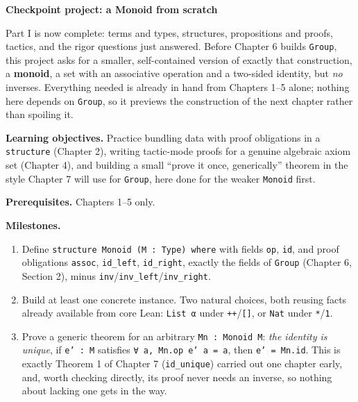 \begin{pblproject}
\label{sec:05-rigor-check:06-checkpoint-project:1}
\textbf{\large Checkpoint project: a Monoid from scratch}\par\smallskip


Part I is now complete: terms and types, structures, propositions and proofs, tactics, and the rigor questions just answered. Before Chapter 6 builds \texttt{Group}, this project asks for a smaller, self-contained version of exactly that construction, a \textbf{monoid}, a set with an associative operation and a two-sided identity, but \emph{no} inverses. Everything needed is already in hand from Chapters 1--5 alone; nothing here depends on \texttt{Group}, so it previews the construction of the next chapter rather than spoiling it.

\textbf{Learning objectives.} Practice bundling data with proof obligations in a \texttt{structure} (Chapter 2), writing tactic-mode proofs for a genuine algebraic axiom set (Chapter 4), and building a small ``prove it once, generically'' theorem in the style Chapter 7 will use for \texttt{Group}, here done for the weaker \texttt{Monoid} first.

\textbf{Prerequisites.} Chapters 1--5 only.

\textbf{Milestones.}

\begin{enumerate}
\def\labelenumi{\arabic{enumi}.}
\tightlist
\item
  Define \texttt{structure Monoid (M : Type) where} with fields \texttt{op}, \texttt{id}, and proof obligations \texttt{assoc}, \texttt{id\_\allowbreak{}left}, \texttt{id\_\allowbreak{}right}, exactly the fields of \texttt{Group} (Chapter 6, Section 2), minus \texttt{inv}/\texttt{inv\_\allowbreak{}left}/\texttt{inv\_\allowbreak{}right}.
\item
  Build at least one concrete instance. Two natural choices, both reusing facts already available from core Lean: \texttt{List α} under \texttt{++}/\texttt{[]}, or \texttt{Nat} under \texttt{*}/\texttt{1}.
\item
  Prove a generic theorem for an arbitrary \texttt{Mn : Monoid M}: \emph{the identity is unique}, if \texttt{e' : M} satisfies \texttt{∀ a, Mn.op e' a = a}, then \texttt{e' = Mn.id}. This is exactly Theorem 1 of Chapter 7 (\texttt{id\_\allowbreak{}unique}) carried out one chapter early, and, worth checking directly, its proof never needs an inverse, so nothing about lacking one gets in the way.
\end{enumerate}


\end{pblproject}
